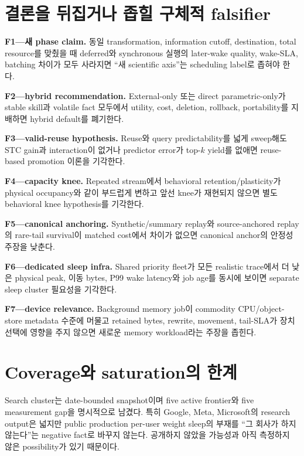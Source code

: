 \section{결론을 뒤집거나 좁힐 구체적 falsifier}

\textbf{F1---새 phase claim.} 동일 transformation, information cutoff, destination, total resource를
맞췄을 때 deferred와 synchronous 실행의 later-wake quality, wake-SLA, batching 차이가 모두 사라지면
``새 scientific axis''는 scheduling label로 좁혀야 한다.

\textbf{F2---hybrid recommendation.} External-only 또는 direct parametric-only가 stable skill과 volatile
fact 모두에서 utility, cost, deletion, rollback, portability를 지배하면 hybrid default를 폐기한다.

\textbf{F3---valid-reuse hypothesis.} Reuse와 query predictability를 넓게 sweep해도 STC gain과 interaction이
없거나 predictor error가 top-$k$ yield를 없애면 reuse-based promotion 이론을 기각한다.

\textbf{F4---capacity knee.} Repeated stream에서 behavioral retention/plasticity가 physical occupancy와
같이 부드럽게 변하고 앞선 knee가 재현되지 않으면 별도 behavioral knee hypothesis를 기각한다.

\textbf{F5---canonical anchoring.} Synthetic/summary replay와 source-anchored replay의 rare-tail survival이
matched cost에서 차이가 없으면 canonical anchor의 안정성 주장을 낮춘다.

\textbf{F6---dedicated sleep infra.} Shared priority fleet가 모든 realistic trace에서 더 낮은 physical
peak, 이동 bytes, P99 wake latency와 job age를 동시에 보이면 separate sleep cluster 필요성을 기각한다.

\textbf{F7---device relevance.} Background memory job이 commodity CPU/object-store metadata 수준에 머물고
retained bytes, rewrite, movement, tail-SLA가 장치 선택에 영향을 주지 않으면 새로운 memory workload라는
주장을 좁힌다.

\section{Coverage와 saturation의 한계}

Search cluster는 date-bounded snapshot이며 five active frontier와 five measurement gap을 명시적으로
남겼다. 특히 Google, Meta, Microsoft의 research output은 넓지만 public production per-user weight sleep의
부재를 ``그 회사가 하지 않는다''는 negative fact로 바꾸지 않는다. 공개하지 않았을 가능성과 아직
측정하지 않은 possibility가 있기 때문이다.

